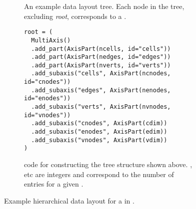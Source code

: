 \begin{figure}
  \centering
  \begin{subfigure}{.9\textwidth}
    \centering
    \caption{
      An example data layout tree.
      Each node in the tree, excluding \textit{root}, corresponds to a  .
    }
    \label{fig:vdat_tree}
  \end{subfigure}
  
  \vspace{1em}

  \begin{subfigure}{.9\textwidth}
    \begin{verbatim}
root = (
  MultiAxis()
  .add_part(AxisPart(ncells, id="cells"))
  .add_part(AxisPart(nedges, id="edges"))
  .add_part(AxisPart(nverts, id="verts"))
  .add_subaxis("cells", AxisPart(ncnodes, id="cnodes"))
  .add_subaxis("edges", AxisPart(nenodes, id="enodes"))
  .add_subaxis("verts", AxisPart(nvnodes, id="vnodes"))
  .add_subaxis("cnodes", AxisPart(cdim))
  .add_subaxis("enodes", AxisPart(edim))
  .add_subaxis("vnodes", AxisPart(vdim))
)
    \end{verbatim}
    \caption{
       code for constructing the tree structure shown above.
      ,  etc are integers and correspond to the number of entries for a given .
    }
    \label{lis:demotreecode}
  \end{subfigure}
  \caption{Example hierarchical data layout for a  in .}
  \label{fig:demotree}
\end{figure}

